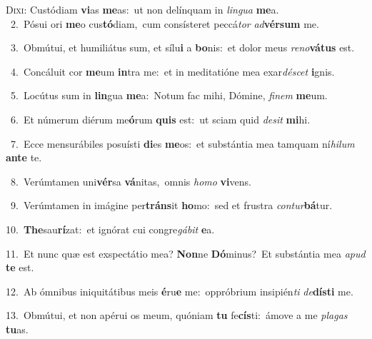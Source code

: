 \lettrine{\initial\textcolor{\initialcolor}{D}}{ixi:} Custódiam \textbf{vi}\-as \textbf{me}\-as:~\star ut non delínquam in \textit{lin}\-\textit{gua} \textbf{me}\-a.\\
{\numbfont\textcolor{\numbcolor}{~2.}}~Pósui ori \textbf{me}\-o cus\-\textbf{tó}\-diam,~\star cum consísteret peccá\textit{tor} \textit{ad}\-\textbf{vér}\textbf{sum} me.\par
{\numbfont\textcolor{\numbcolor}{~3.}}~Obmútui, et humiliátus sum, et sílu\textbf{i} a \textbf{bo}\-nis:~\star et dolor meus \textit{re}\-\textit{no}\textbf{vá}\textbf{tus} est.\par
{\numbfont\textcolor{\numbcolor}{~4.}}~Concáluit cor \textbf{me}\-um \textbf{in}\-tra me:~\star et in meditatióne mea exar\-\textit{dé}\-\textit{scet} \textbf{i}\-gnis.\par
{\numbfont\textcolor{\numbcolor}{~5.}}~Locútus sum in \textbf{lin}\-gua \textbf{me}\-a:~\star Notum fac mihi, Dómine, \textit{fi}\-\textit{nem} \textbf{me}\-um.\par
{\numbfont\textcolor{\numbcolor}{~6.}}~Et númerum diérum me\-\textbf{ó}\-rum \textbf{quis} est:~\star ut sciam quid \textit{de}\-\textit{sit} \textbf{mi}\-hi.\par
{\numbfont\textcolor{\numbcolor}{~7.}}~Ecce mensurábiles posuísti \textbf{di}\-es \textbf{me}\-os:~\star et substántia mea tamquam ní\-\textit{hi}\-\textit{lum} \textbf{an}\-\textbf{te} te.\par
{\numbfont\textcolor{\numbcolor}{~8.}}~Verúmtamen uni\-\textbf{vér}\-sa \textbf{vá}\-nitas,~\star omnis \textit{ho}\-\textit{mo} \textbf{vi}\-vens.\par
{\numbfont\textcolor{\numbcolor}{~9.}}~Verúmtamen in imágine per\-\textbf{tráns}\-it \textbf{ho}\-mo:~\star sed et frustra \textit{con}\-\textit{tur}\textbf{bá}tur.\par
{\numbfont\textcolor{\numbcolor}{10.}}~\-\textbf{The}\-sau\-\textbf{rí}\-zat:~\star et ignórat cui congre\-\textit{gá}\-\textit{bit} \textbf{e}\-a.\par
{\numbfont\textcolor{\numbcolor}{11.}}~Et nunc quæ est exspectátio mea? \textbf{Non}\-ne \textbf{Dó}\-minus?~\star Et substántia mea \textit{a}\-\textit{pud} \textbf{te} est.\par
{\numbfont\textcolor{\numbcolor}{12.}}~Ab ómnibus iniquitátibus meis \textbf{é}\-ru\textbf{e} me:~\star oppróbrium insipién\textit{ti} \textit{de}\-\textbf{dís}\textbf{ti} me.\par
{\numbfont\textcolor{\numbcolor}{13.}}~Obmútui, et non apérui os meum, quóniam \textbf{tu} fe\-\textbf{cís}\-ti:~\star ámove a me \textit{pla}\-\textit{gas} \textbf{tu}\-as.\par
